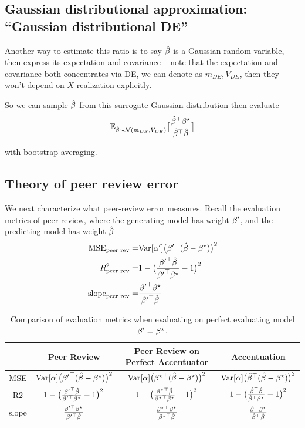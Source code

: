 \subsection{Gaussian distributional approximation: ``Gaussian distributional
DE'' }
\label{sec:app-ratio-gaussian}

Another way to estimate this ratio is to say $\hat{\beta}$ is a Gaussian
random variable, then express its expectation and covariance -- note
that the expectation and covariance both concentrates via DE, we can
denote as $m_{DE},V_{DE}$, then they won't depend on $X$ realization
explicitly.

So we can sample $\hat{\beta}$ from this surrogate Gaussian distribution
then evaluate
\[
\mathbb{E}_{\hat{\beta}\sim\mathcal{N}(m_{DE},V_{DE})}\big[\frac{{\hat{\beta}}^{\top}{\beta^{\star}}}{{\hat{\beta}}^{\top}\hat{\beta}}\big]
\]

with bootstrap averaging.

\subsection{Theory of peer review error}

We next characterize what peer-review error measures. Recall the
evaluation metrics of peer review, where the generating model has
weight ${\beta^{\prime}}$, and the predicting model has weight $\hat{\beta}$
\begin{align*}
\mathrm{MSE}_{\text{peer rev}}= & \mathrm{Var}[\alpha^{\prime}]\big({{\beta^{\prime}}}^{\top}(\hat{\beta}-{\beta^{\star}})\big)^{2}\\
R_{\text{peer rev}}^{2}= & 1-\big(\frac{{{\beta^{\prime}}}^{\top}\hat{\beta}}{{{\beta^{\prime}}}^{\top}{\beta^{\star}}}-1\big)^{2}\\
\mathrm{slope}_{\text{peer rev}}= & \frac{{{\beta^{\prime}}}^{\top}{\beta^{\star}}}{{{\beta^{\prime}}}^{\top}\hat{\beta}}
\end{align*}

\begin{table}
\begin{centering}
\begin{tabular}{|c|c|c|c|}
\hline
 & Peer Review & Peer Review on Perfect Accentuator & Accentuation\tabularnewline
\hline
\hline
MSE & $\mathrm{Var}[\alpha]\big({{\beta^{\prime}}}^{\top}(\hat{\beta}-{\beta^{\star}})\big)^{2}$ & $\mathrm{Var}[\alpha]\big({{\beta^{\star}}}^{\top}(\hat{\beta}-{\beta^{\star}})\big)^{2}$ & $\mathrm{Var}[\alpha]\big({\hat{\beta}}^{\top}(\hat{\beta}-{\beta^{\star}})\big)^{2}$\tabularnewline
\hline
R2 & $1-\big(\frac{{{\beta^{\prime}}}^{\top}\hat{\beta}}{{{\beta^{\prime}}}^{\top}{\beta^{\star}}}-1\big)^{2}$ & $1-\big(\frac{{{\beta^{\star}}}^{\top}\hat{\beta}}{{{\beta^{\star}}}^{\top}{\beta^{\star}}}-1\big)^{2}$ & $1-\big(\frac{{\hat{\beta}}^{\top}\hat{\beta}}{{\hat{\beta}}^{\top}{\beta^{\star}}}-1\big)^{2}$\tabularnewline
\hline
slope & $\frac{{{\beta^{\prime}}}^{\top}{\beta^{\star}}}{{{\beta^{\prime}}}^{\top}\hat{\beta}}$ & $\frac{{{\beta^{\star}}}^{\top}{\beta^{\star}}}{{{\beta^{\star}}}^{\top}\hat{\beta}}$ & $\frac{{\hat{\beta}}^{\top}{\beta^{\star}}}{{\hat{\beta}}^{\top}\hat{\beta}}$\tabularnewline
\hline
\end{tabular}
\par\end{centering}
\caption{Comparison of evaluation metrics when evaluating on perfect evaluating
model ${\beta^{\prime}}={\beta^{\star}}$.}
\end{table}


